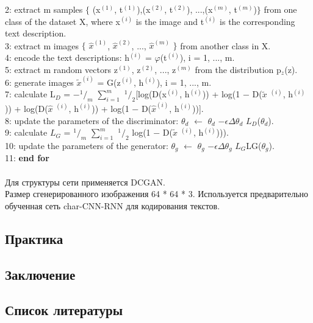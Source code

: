 \documentclass{article}
\begin{document}
    2: \indent extract m samples $\{$ (x$^(1)$, t$^{(1)}$),(x$^{(2)}$, t$^{(2)}$), ...,(x$^{(m)}$, t$^{(m)}$)$\}$ from one class of the dataset X, where x$^{(i)}$ is the image and t$^{(i)}$ is the corresponding text description.\\
    3: \indent extract m images $\{$ $\hat{x}^{(1)}$, $\hat{x}^{(2)}$, ..., $\hat{x}^{(m)}$ $\}$ from another class in X.\\
    4: \indent encode the text descriptions: h$^{(i)}$ = $\varphi$(t$^{(i)}$), i = 1, ..., m.\\
    5: \indent extract m random vectors {z$^{(1)}$, z$^{(2)}$, ..., z$^{(m)}$} from the distribution p$_z$(z).\\
    6: \indent generate images $\widetilde{x}^{(i)}$ = G(z$^{(i)}$, h$^{(i)}$), i = 1, ..., m.\\
    7: \indent calculate L$_D$ = −$^1/_m$ $\sum_{i=1}^{m}$ $^1/_2$[log(D(x$^{(i)}$, h$^{(i)}$)) + log(1 − D($\widetilde{x}$ $^{(i)}$, h$^{(i)}$)) + log(D($\hat{x}$ $^{(i)}$, h$^{(i)}$)) + log(1 − D($\hat{x}^{(i)}$, h$^{(i)}$))].\\
    8: \indent update the parameters of the discriminator: $\theta _{d}$ $\leftarrow$ $\theta _{d}$ $- \epsilon \Delta$$\theta _{d}$ $L_{D}$($\theta _{d}$).\\
    9: \indent calculate $L_{G}$ = $^1/_m$ $\sum_{i=1}^{m}$ $^1/_2$ log(1 − D($\widetilde{x}$ $^{(i)}$, h$^{(i)}$))).\\
    10: \indent update the parameters of the generator: $\theta _{g}$ $\leftarrow$ $\theta _{g}$ $ - \epsilon \Delta$$\theta _{g}$ $L_{G}$LG($\theta _{g}$).\\
    11: \textbf {end for}
    \\ \\ 
    Для структуры сети применяется DCGAN. \\
    Размер сгенерированного изображения 64 * 64 * 3. Используется предварительно обученная сеть char-CNN-RNN для кодирования текстов.
    
    \newpage
    \begin{center} 
    \section{Практика}
    \end{center} 
    
    \newpage
    \begin{center} 
    \section{Заключение}
    \end{center} 
    
    \newpage
    \begin{center} 
    \section{Список литературы}
    \end{center} 
    
\end{document}

